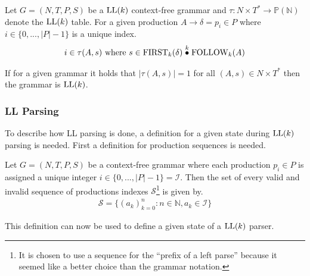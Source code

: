 \begin{definition}[$\LL(k)$ table]
    Let $G = (N, T, P, S)$ be a $\LL(k)$ context-free grammar and $\tau : N \times T^* \to \mathbb{P}(\mathbb{N})$ denote the $\LL(k)$ table. For a given production $A \to \delta = p_i \in P$ where $i \in \{0, ..., |P| - 1\}$ is a unique index.
    \begin{gather*}
        i \in \tau(A, s) \text{ where } s \in \FIRST_k(\delta) \truncprod{k} \FOLLOW_k(A)
    \end{gather*}
\end{definition}
\noindent If for a given grammar it holds that $|\tau(A, s)| = 1$ for all $(A, s) \in N \times T^*$ then the grammar is $\LL(k)$.

\subsubsection{LL Parsing}
To describe how LL parsing is done, a definition for a given state during $\LL(k)$ parsing is needed. First a definition for production sequences is needed.

\begin{definition}
    \label{def:production-sequence}
    Let $G = (N, T, P, S)$ be a context-free grammar where each production $p_i \in P$ is assigned a unique integer $i \in \{0, ..., |P| - 1\} = \mathcal{I}$. Then the set of every valid and invalid sequence of productions indexes $\mathcal{S}$\footnote{It is chosen to use a sequence for the ``prefix of a left parse'' \cite[5]{Vagner2007} because it seemed like a better choice than the grammar notation.} is given by.
    \begin{align*}
        \mathcal{S} = \{(a_k)_{k=0}^n : n \in \mathbb{N}, a_k \in \mathcal{I}\}
    \end{align*}
\end{definition}
\noindent This definition can now be used to define a given state of a $\LL(k)$ parser. 

